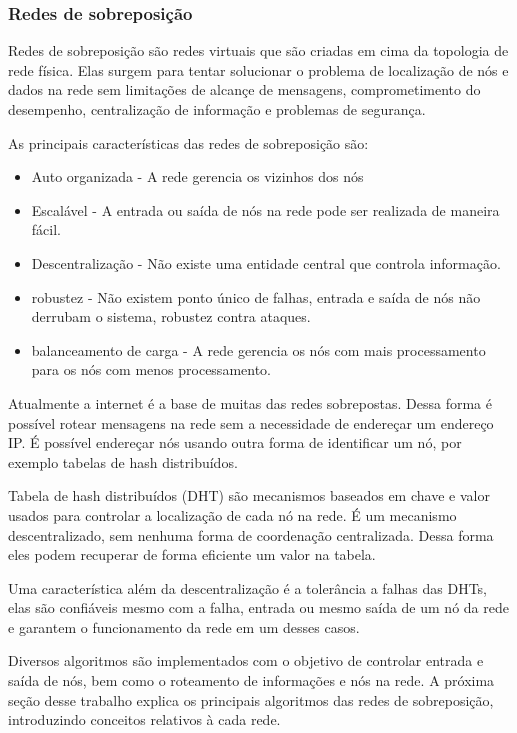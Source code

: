 \subsubsection{Redes de sobreposição}

Redes de sobreposição são redes virtuais que são criadas em cima da topologia de rede física. Elas surgem para tentar solucionar o problema de localização de nós e dados na rede sem limitações de alcançe de mensagens, comprometimento do desempenho, centralização de informação e problemas de segurança.

As principais características das redes de sobreposição são:

\begin{itemize}
	\item Auto organizada - A rede gerencia os vizinhos dos nós
	\item Escalável - A entrada ou saída de nós na rede pode ser realizada de maneira fácil.
	\item Descentralização - Não existe uma entidade central que controla informação.
	\item robustez - Não existem ponto único de falhas, entrada e saída de nós não derrubam o sistema, robustez contra ataques.
	\item balanceamento de carga - A rede gerencia os nós com mais processamento para os nós com menos processamento.
\end{itemize}

Atualmente a internet é a base de muitas das redes sobrepostas. Dessa forma é possível rotear mensagens na rede sem a necessidade de endereçar um endereço IP. É possível endereçar nós usando outra forma de identificar um nó, por exemplo tabelas de hash distribuídos.

Tabela de hash distribuídos (DHT) são mecanismos baseados em chave e valor usados para controlar a localização de cada nó na rede. É um mecanismo descentralizado, sem nenhuma forma de coordenação centralizada. Dessa forma eles podem recuperar de forma eficiente um valor na tabela.

Uma característica além da descentralização é a tolerância a falhas das DHTs, elas são confiáveis mesmo com a falha, entrada ou mesmo saída de um nó da rede e garantem o funcionamento da rede em um desses casos.

Diversos algoritmos são implementados com o objetivo de controlar entrada e saída de nós, bem como o roteamento de informações e nós na rede. A próxima seção desse trabalho explica os principais algoritmos das redes de sobreposição, introduzindo conceitos relativos à cada rede.

